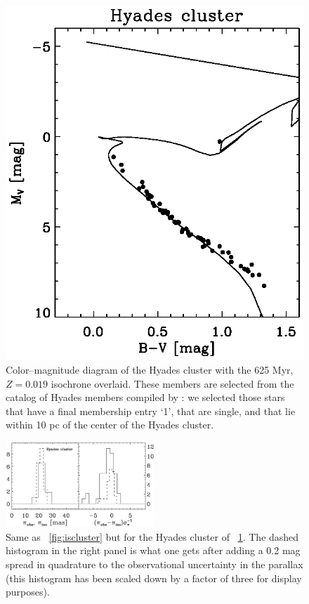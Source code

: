 \clearpage
\begin{figure}
\begin{center}
\includegraphics{figs_groups/hyadesClusterCMD.ps}
\end{center}
\caption[Color--magnitude diagram of the Hyades cluster with the 625
  Myr, $Z=0.019$ isochrone overlaid]{Color--magnitude diagram of the
  Hyades cluster with the 625 Myr, $Z=0.019$ isochrone overlaid. These
  members are selected from the catalog of Hyades members compiled by
  \citet{Perryman98a}: we selected those stars that have a final
  membership entry `1', that are single, and that lie within 10 pc of
  the center of the Hyades cluster.}\label{fig:hyadesclustercmd}
\end{figure}

\clearpage
\begin{figure}
\includegraphics[width=0.5\textwidth]{figs_groups/hyadesClusterHist.eps}
\caption[Same as \figurename~\ref{fig:iscluster} but for the Hyades
cluster of \figurename~\ref{fig:hyadesclustercmd}]{Same as
\figurename~\ref{fig:iscluster} but for the Hyades cluster of
\figurename~\ref{fig:hyadesclustercmd}. The dashed histogram in the
right panel is what one gets after adding a 0.2 mag spread in
quadrature to the observational uncertainty in the parallax (this
histogram has been scaled down by a factor of three for display
purposes).}\label{fig:hyadesclusterhist}
\end{figure}

